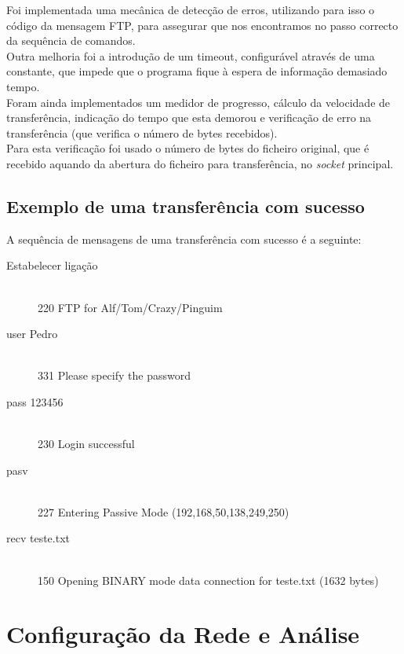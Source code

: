 \documentclass[a4paper,11pt]{article}
\begin{document}
Foi implementada uma mecânica de detecção de erros, utilizando para isso o código da mensagem FTP, para assegurar que nos encontramos no passo correcto da sequência de comandos.\\

Outra melhoria foi a introdução de um timeout, configurável através de uma constante, que impede que o programa fique à espera de informação demasiado tempo.\\

Foram ainda implementados um medidor de progresso, cálculo da velocidade de transferência, indicação do tempo que esta demorou e verificação de erro na transferência (que verifica o número de bytes recebidos).\\

Para esta verificação foi usado o número de bytes do ficheiro original, que é recebido aquando da abertura do ficheiro para transferência, no \textit{socket} principal.

\pagebreak
\subsection{Exemplo de uma transferência com sucesso}
A sequência de mensagens de uma transferência com sucesso é a seguinte:
\begin{description}
\item[Estabelecer ligação] \hfill \\

220 FTP for Alf/Tom/Crazy/Pinguim
\item[user Pedro] \hfill \\

331 Please specify the password
\item[pass 123456] \hfill \\

230 Login successful
\item[pasv] \hfill \\

227 Entering Passive Mode (192,168,50,138,249,250)
\item[recv teste.txt] \hfill \\

150 Opening BINARY mode data connection for teste.txt (1632 bytes)
\end{description}

\section{Configuração da Rede e Análise }
\end{document}
